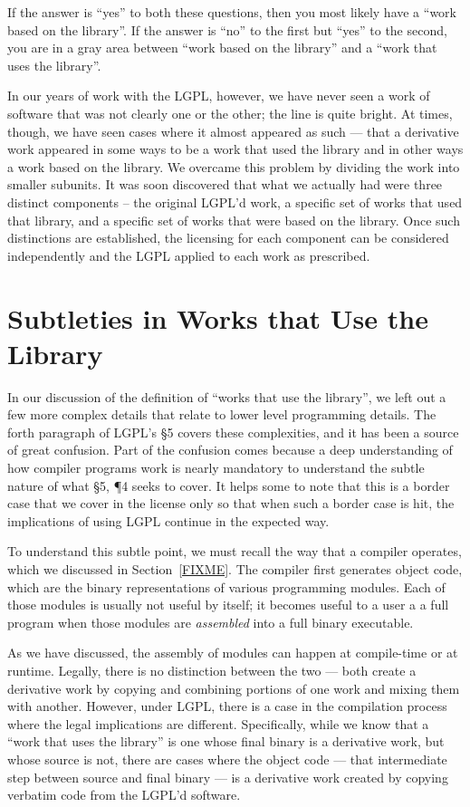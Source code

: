\documentclass[12pt]{report}
\begin{document}
If the answer is ``yes'' to both these questions, then you most likely
have a ``work based on the library''.  If the answer is ``no'' to the
first but ``yes'' to the second, you are in a gray area between ``work
based on the library'' and a ``work that uses the library''.

In our years of work with the LGPL, however, we have never seen a work of
software that was not clearly one or the other; the line is quite bright.
At times, though, we have seen cases where it almost appeared as such ---
that a derivative work appeared in some ways to be a work that used the
library and in other ways a work based on the library.  We overcame this
problem by dividing the work into smaller subunits.  It was soon
discovered that what we actually had were three distinct components -- the
original LGPL'd work, a specific set of works that used that library, and
a specific set of works that were based on the library.  Once such
distinctions are established, the licensing for each component can be
considered independently and the LGPL applied to each work as prescribed.


\section{Subtleties in Works that Use the Library}

In our discussion of the definition of ``works that use the library'', we
left out a few more complex details that relate to lower level programming
details.  The forth paragraph of LGPL's \S 5 covers these complexities,
and it has been a source of great confusion.  Part of the confusion comes
because a deep understanding of how compiler programs work is nearly
mandatory to understand the subtle nature of what \S 5, \P 4 seeks to
cover.  It helps some to note that this is a border case that we cover in
the license only so that when such a border case is hit, the implications
of using LGPL continue in the expected way.

To understand this subtle point, we must recall the way that a compiler
operates, which we discussed in Section~\ref{FIXME}.  The compiler first
generates object code, which are the binary representations of various
programming modules.  Each of those modules is usually not useful by
itself; it becomes useful to a user a a full program when those modules
are {\em assembled\/} into a full binary executable.

As we have discussed, the assembly of modules can happen at compile-time
or at runtime.  Legally, there is no distinction between the two --- both
create a derivative work by copying and combining portions of one work and
mixing them with another.  However, under LGPL, there is a case in the
compilation process where the legal implications are different.
Specifically, while we know that a ``work that uses the library'' is one
whose final binary is a derivative work, but whose source is not, there
are cases where the object code --- that intermediate step between source
and final binary --- is a derivative work created by copying verbatim code
from the LGPL'd software.
\end{document}
